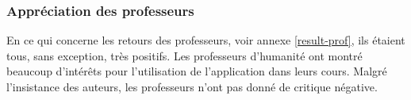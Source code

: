 \subsubsection{Appréciation des professeurs}
En ce qui concerne les retours des professeurs, voir annexe \ref{result-prof}, ils étaient tous, sans exception, très positifs. Les professeurs d'humanité ont montré beaucoup d'intérêts pour l'utilisation de l'application dans leurs cours. Malgré l'insistance des auteurs, les professeurs n'ont pas donné de critique négative.
